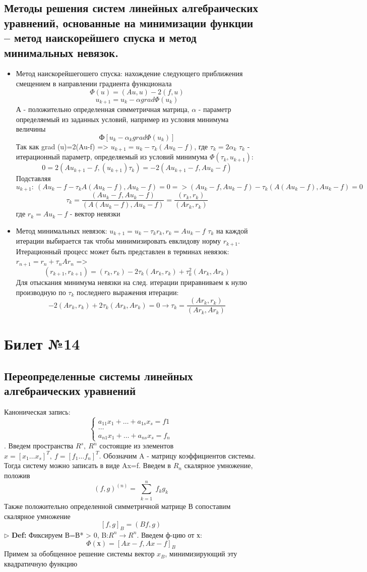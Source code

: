 \documentclass[a4paper]{article}
\begin{document}
\subsection{Методы решения систем линейных алгебраических уравнений, основанные на минимизации функции – метод наискорейшего спуска и метод минимальных невязок.}
\begin{itemize}
	\item Метод наискорейшегошего спуска: нахождение следующего приближения смещением в направлении градиента функционала
	$$ \Phi(u)=(Au,u)-2(f,u) $$
	$$ u_{k+1}=u_k - \alpha grad\Phi(u_k) $$
	А - положительно определенная симметричная матрица, $\alpha$ - параметр определяемый из заданных условий, например из условия минимума величины 
	$$ Ф[u_k-\alpha_k grad \Phi(u_k)] $$
	Так как grad \Phi(u)=2(Au-f) => $ u_{k+1} = u_k - \tau_k(Au_k-f) $, где $\tau_k=2\alpha_k$
	$\tau_k$ - итерационный параметр, определяемый из условий минимума $\Phi(\tau_k,u_{k+1})$: 
	$$ 0=2(Au_{k+1}-f, (u_{k+1})\tau_k) = -2(Au_{k+1}-f,Au_k-f)$$
	Подставляя $u_{k+1}: \ (Au_k-f-\tau_kA(Au_k-f),Au_k-f)=0 => (Au_k-f,Au_k-f)-\tau_k(A(Au_k-f),Au_k-f)=0$
	$$\tau_k=\frac{(Au_k-f,Au_k-f)}{(A(Au_k-f),Au_k-f)}=\frac{(r_k,r_k)}{(Ar_k,r_k)} $$ где $r_k=Au_k-f$ - вектор невязки
	\item Метод минимальных невязок: $u_{k+1} = u_k -\tau_k r_k, r_k=Au_k-f$
	$\tau_k$ на каждой итерации выбирается так чтобы минимизировать евклидову норму $r_{k+1}$. Итерационный процесс может быть представлен в терминах невязок: $r_{n+1}=r_n+\tau_n Ar_n$ =>
	$$ (r_{k+1}, r_{k+1}) = (r_k,r_k) - 2\tau_k(Ar_k,r_k) + \tau_k^2(Ar_k,Ar_k) $$
	Для отыскания минимума невязки на след. итерации приравниваем к нулю производную по $\tau_k$ последнего выражения итерации:
	$$-2(Ar_k,r_k)+2\tau_k(Ar_k,Ar_k) = 0 \rightarrow \tau_k = \frac{(Ar_k,r_k)}{(Ar_k,Ar_k)} $$
\end{itemize}

\section{Билет №14}
\subsection{Переопределенные системы линейных алгебраических уравнений}
Каноническая запись:
$$ \begin{cases}
a_{11}x_1 + \ldots + a_{1s}x_s = f1 \\
\ldots \\
a_{n1}x_1 + \ldots + a_{ns}x_s = f_n \end{cases}
$$. 
Введем пространства $R^s, \ R^n$ состоящие из элементов $x=[x_1 \ldots x_s]^T, \ f=[f_1 \ldots f_n]^T$. Обозначим A - матрицу коэффициентов системы. Тогда систему можно записать в виде Ax=f. Введем в $R_n$ скалярное умножение, положив $$ (f,g)^{(n)} = \sum_{\substack{k=1}}^n f_kg_k $$
Также положительно определенной симметричной матрице В сопоставим скалярное умножение $$[f,g]_B=(Bf,g)$$
$\triangleright$ \textbf{Def:} Фиксируем В=В* > 0, B:$R^n \rightarrow R^n$. Введем ф-цию от х: $$ \Phi(х) = [Ax-f,Ax-f]_B $$
Примем за обобщенное решение системы вектор $x_B$, минимизирующий эту квадратичную функцию\\
\end{document}
